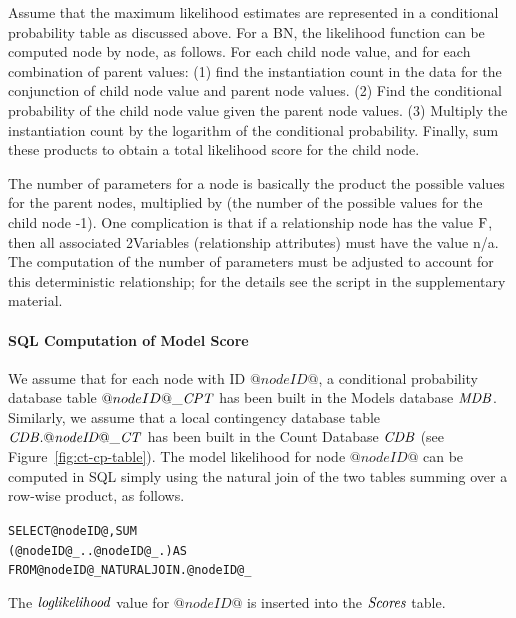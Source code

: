 \documentclass{acm_proc_article-sp}
\begin{document}
Assume that the maximum likelihood estimates are represented in a conditional probability table as discussed above. For a BN, the likelihood function can be computed node by node, as follows. For each child node value, and for each combination of parent values: (1) find the instantiation count in the data for the conjunction of child node value and parent node values. (2) Find the conditional probability of the child node value given the parent node values. (3) Multiply the instantiation count by the logarithm of the conditional probability. Finally, sum these products to obtain a total likelihood score for the child node.

The number of parameters for a node is basically the product the possible values for the parent nodes, multiplied by (the number of the possible values for the child node -1). One complication is that if a relationship node has the value $\mathrm{F}$, then all associated 2Variables (relationship attributes) must have the value n/a. The computation of the number of parameters must be adjusted to account for this deterministic relationship; for the details see the script in the supplementary material. 

\paragraph{SQL Computation of Model Score} We assume that for each node with ID $@nodeID@$, a conditional probability database table $@nodeID@\_\it{CPT}$ has been built in the Models database $\it{MDB}$. Similarly, we assume that
a local contingency database table $\it{CDB}.@nodeID@\_\it{CT}$ has been built in the Count Database $\it{CDB}$ (see Figure~\ref{fig:ct-cp-table}). The model likelihood for node $@nodeID@$ can be computed in SQL simply using the natural join of the two tables summing over a row-wise product, as follows.


\begin{alltt}
SELECT @nodeID@,  SUM
(@nodeID@\_\cptable.\cpcol * \CDB.@nodeID@\_\cttable.\countcol) AS \loglikelihood
FROM @nodeID@\_\cptable NATURAL JOIN \CDB.@nodeID@\_\cttable
\end{alltt}

The $\it{loglikelihood}$ value for $@nodeID@$ is inserted into the $\it{Scores}$ table. 

\end{document}
